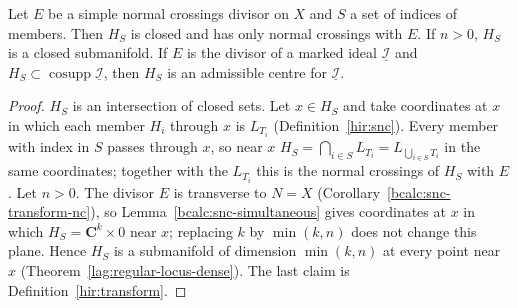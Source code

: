 \begin{lemma}
\label{bcalc:member-intersection}
\mixedleanok
Let \(E\) be a simple normal crossings divisor on \(X\) and \(S\) a set of indices of members. Then \(H_S\) is closed and has only normal
crossings with \(E\). If \(n>0\), \(H_S\) is a closed submanifold. If \(E\) is the divisor of a marked ideal \(\underline{\mathcal I}\) and
\(H_S\subset\operatorname{cosupp}\underline{\mathcal I}\), then \(H_S\) is an admissible centre for \(\underline{\mathcal I}\).
\end{lemma}
\begin{proof}
\mixedleanok
\(H_S\) is an intersection of closed sets. Let \(x\in H_S\) and take coordinates at \(x\) in which each member \(H_i\) through \(x\) is
\(L_{T_i}\) (Definition~\ref{hir:snc}). Every member with index in \(S\) passes through \(x\), so near \(x\)
\(H_S=\bigcap_{i\in S}L_{T_i}=L_{\bigcup_{i\in S}T_i}\) in the same coordinates; together with the \(L_{T_i}\) this is the normal crossings of
\(H_S\) with \(E\). Let \(n>0\). The divisor \(E\) is transverse to \(N=X\) (Corollary~\ref{bcalc:snc-transform-nc}), so
Lemma~\ref{bcalc:snc-simultaneous} gives coordinates at \(x\) in which \(H_S=\mathbf C^{k}\times0\) near \(x\); replacing \(k\) by
\(\min(k,n)\) does not change this plane. Hence \(H_S\) is a submanifold of dimension \(\min(k,n)\) at every point near \(x\)
(Theorem~\ref{lag:regular-locus-dense}). The last claim is Definition~\ref{hir:transform}.
\end{proof}

